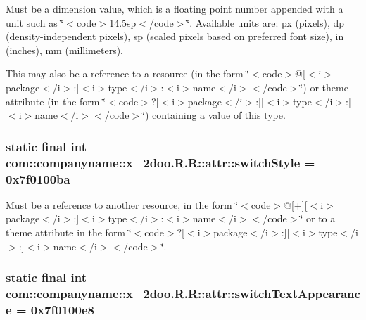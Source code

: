 Must be a dimension value, which is a floating point number appended with a unit such as \char`\"{}$<$code$>$14.5sp$<$/code$>$\char`\"{}. Available units are: px (pixels), dp (density-independent pixels), sp (scaled pixels based on preferred font size), in (inches), mm (millimeters). 

This may also be a reference to a resource (in the form \char`\"{}$<$code$>$@\mbox{[}$<$i$>$package$<$/i$>$:\mbox{]}$<$i$>$type$<$/i$>$:$<$i$>$name$<$/i$>$$<$/code$>$\char`\"{}) or theme attribute (in the form \char`\"{}$<$code$>$?\mbox{[}$<$i$>$package$<$/i$>$:\mbox{]}\mbox{[}$<$i$>$type$<$/i$>$:\mbox{]}$<$i$>$name$<$/i$>$$<$/code$>$\char`\"{}) containing a value of this type. \hypertarget{classcom_1_1companyname_1_1x__2doo_1_1_r_1_1attr_fd77d462534cbec9082a7f764fb19f69}{
\subsubsection[{switchStyle}]{\setlength{\rightskip}{0pt plus 5cm}static final int com::companyname::x\_\-2doo.R.R::attr::switchStyle = 0x7f0100ba}}
\label{classcom_1_1companyname_1_1x__2doo_1_1_r_1_1attr_fd77d462534cbec9082a7f764fb19f69}


Must be a reference to another resource, in the form \char`\"{}$<$code$>$@\mbox{[}+\mbox{]}\mbox{[}$<$i$>$package$<$/i$>$:\mbox{]}$<$i$>$type$<$/i$>$:$<$i$>$name$<$/i$>$$<$/code$>$\char`\"{} or to a theme attribute in the form \char`\"{}$<$code$>$?\mbox{[}$<$i$>$package$<$/i$>$:\mbox{]}\mbox{[}$<$i$>$type$<$/i$>$:\mbox{]}$<$i$>$name$<$/i$>$$<$/code$>$\char`\"{}. \hypertarget{classcom_1_1companyname_1_1x__2doo_1_1_r_1_1attr_57856a91d719e0f3416dda09b39ff2ba}{
\subsubsection[{switchTextAppearance}]{\setlength{\rightskip}{0pt plus 5cm}static final int com::companyname::x\_\-2doo.R.R::attr::switchTextAppearance = 0x7f0100e8}}
\label{classcom_1_1companyname_1_1x__2doo_1_1_r_1_1attr_57856a91d719e0f3416dda09b39ff2ba}


